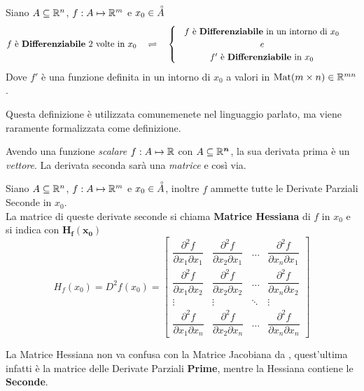\begin{definition}
	\label{def:differenz_second}
	Siano $A \subseteq \mathbb{R}^n$, $f:A \mapsto \mathbb{R}^m$ e $x_0 \in \accentset{\circ}{A}$
	\[
		f \text{ è \textbf{Differenziabile} } 2 \text{ volte in } x_0
		\quad \bydef \quad
		\begin{cases}
			\text{
				\begin{tabular}{c}
					$f$ è \textbf{Differenziabile} in un intorno di $x_0$\\
					\textit{e}\\
					$f'$ è \textbf{Differenziabile} in $x_0$
				\end{tabular}
			}
		\end{cases}
	\]
	Dove $f'$ è una funzione definita in un intorno di $x_0$ a valori in $\operatorname{Mat}(m \times n) \in \mathbb{R}^{mn}$.
	\begin{note}
		Questa definizione è utilizzata comunemenete nel linguaggio parlato, ma viene raramente formalizzata come definizione.
	\end{note}
	\begin{note}
		Avendo una funzione	\textit{scalare} $f: A \mapsto \mathbb{R}$ con $A \subseteq \boldsymbol{\mathbb{R}^n}$, la sua derivata prima è un \textit{vettore}. La derivata seconda sarà una \textit{matrice} e così via.
	\end{note}
\end{definition}

\begin{definition}
	\label{def:hessiana}
	Siano $A \subseteq \mathbb{R}^n$, $f:A \mapsto \mathbb{R}^m$ e $x_0 \in \accentset{\circ}{A}$, inoltre $f$ ammette tutte le Derivate Parziali Seconde in $x_0$.\\
	La matrice di queste derivate seconde si chiama \textbf{Matrice Hessiana} di $f$ in $x_0$ e si indica con $\boldsymbol{H_f(x_0)}$
	\[
		H_f(x_0) = D^2f(x_0) =
		\begin{bmatrix}
			\dfrac{\partial^2 f}{\partial x_1 \partial x_1} & \dfrac{\partial^2 f}{\partial x_2 \partial x_1} & \dots & \dfrac{\partial^2 f}{\partial x_n \partial x_1}\\[3ex]
			\dfrac{\partial^2 f}{\partial x_1 \partial x_2} & \dfrac{\partial^2 f}{\partial x_2 \partial x_2} & \dots & \dfrac{\partial^2 f}{\partial x_n \partial x_2}\\[3ex]
			\vdots & \vdots & \ddots & \vdots\\[3ex]
			\dfrac{\partial^2 f}{\partial x_1 \partial x_n} & \dfrac{\partial^2 f}{\partial x_2 \partial x_n} & \dots & \dfrac{\partial^2 f}{\partial x_n \partial x_n}
		\end{bmatrix}
	\]
	\begin{note}
		La Matrice Hessiana non va confusa con la Matrice Jacobiana da , quest'ultima infatti è la matrice delle Derivate Parziali \textbf{Prime}, mentre la Hessiana contiene le \textbf{Seconde}.
	\end{note}
\end{definition}

